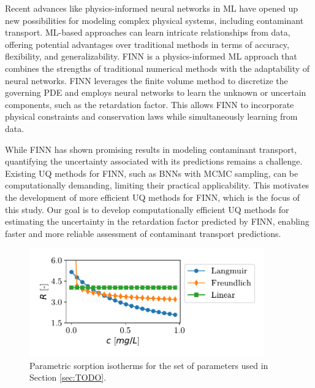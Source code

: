Recent advances like physics-informed neural networks in ML have opened up new possibilities for modeling complex physical systems, including contaminant transport. ML-based approaches can learn intricate relationships from data, offering potential advantages over traditional methods in terms of accuracy, flexibility, and generalizability. FINN \cite{finn} is a physics-informed ML approach that combines the strengths of traditional numerical methods with the adaptability of neural networks. FINN leverages the finite volume method to discretize the governing PDE and employs neural networks to learn the unknown or uncertain components, such as the retardation factor. This allows FINN to incorporate physical constraints and conservation laws while simultaneously learning from data.

While FINN has shown promising results in modeling contaminant transport, quantifying the uncertainty associated with its predictions remains a challenge. Existing UQ methods for FINN, such as BNNs with MCMC sampling, can be computationally demanding, limiting their practical applicability. This motivates the development of more efficient UQ methods for FINN, which is the focus of this study. Our goal is to develop computationally efficient UQ methods for estimating the uncertainty in the retardation factor predicted by FINN, enabling faster and more reliable assessment of contaminant transport predictions.

\begin{figure}
    \centering
    \includegraphics[width=0.9\textwidth]{figs/parametric_isotherms.pdf}
    \caption{Parametric sorption isotherms for the set of parameters used in Section \vref{sec:TODO}.}
    \label{fig:parametric_isotherms}
\end{figure}



